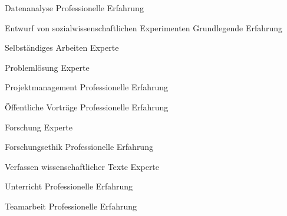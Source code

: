 \documentclass[11pt, a4]{academic-cv}
\begin{document}
\begin{cvskills}
\cvskill
{}
{Datenanalyse}
{Professionelle Erfahrung}

\cvskill
{}
{Entwurf von sozialwissenschaftlichen Experimenten}
{Grundlegende Erfahrung}

\cvskill
{}
{Selbständiges Arbeiten}
{Experte}

\cvskill
{}
{Problemlösung}
{Experte}

\cvskill
{}
{Projektmanagement}
{Professionelle Erfahrung}

\cvskill
{}
{Öffentliche Vorträge}
{Professionelle Erfahrung}

\cvskill
{}
{Forschung}
{Experte}

\cvskill
{}
{Forschungsethik}
{Professionelle Erfahrung}

\cvskill
{}
{Verfassen wissenschaftlicher Texte}
{Experte}

\cvskill
{}
{Unterricht}
{Professionelle Erfahrung}

\cvskill
{}
{Teamarbeit}
{Professionelle Erfahrung}

\end{cvskills}


\end{document}
